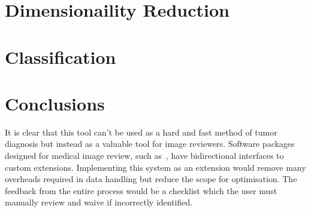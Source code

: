\documentclass[journal]{IEEEtran}
\begin{document}
\section{Dimensionaility Reduction}
\label{sec:reduce}











\section{Classification}
\label{sec:class}









\section{Conclusions}
\label{sec:conclusions}

It is clear that this tool can't be used as a hard and fast method of tumor diagnosis but instead as a valuable tool for image reviewers.
Software packages designed for medical image review, such as~\cite{slicer}, have bidirectional interfaces to custom extensions.
Implementing this system as an extension would remove many overheads required in data handling but reduce the scope for optimisation.
The feedback from the entire process would be a checklist which the user must manually review and waive if incorrectly identified. 












\end{document}
